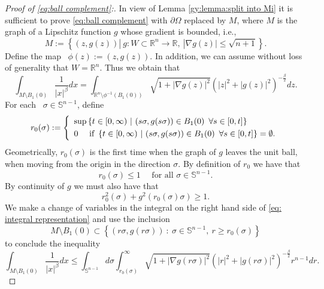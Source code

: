 \documentclass[reqno,12pt]{amsart}
\newcommand{\R}{\mathbb{R}}
\numberwithin{equation}{section}
\theoremstyle{plain}
\theoremstyle{definition}
\renewcommand{\leq}{\leqslant}
\renewcommand{\geq}{\geqslant}
\begin{document}
\begin{proof}
[Proof of \eqref{eq:ball complement}:]   In view of Lemma \ref{gy:lemma:split into Mi} it is sufficient to prove \eqref{eq:ball complement} with $\partial \Omega$ replaced by $M$,  where $M$ is the graph of a Lipschitz function $g$ whose gradient is bounded, i.e., 
$$M := \left\{(z,g(z)) 
 | \ g : W \subset \mathbb{R}^n \rightarrow \mathbb{R}, \ |\nabla g(z)| \leq  \sqrt{n+1} \right\}. 
 $$
Define the map ~$\phi(z):= (z,g(z))$. In addition, we can assume without loss of generality that $W=\R^n.$  Thus we obtain that
\begin{equation}
    \label{eq: integral representation}
    \int_{M\setminus B_1(0)} \frac{1}{|x|^\beta}dx = \int_{\mathbb{R}^n \setminus \phi^{-1}(B_1(0))} \sqrt{1+|\nabla g(z)|^2} \left( |z|^2+ |g(z)|^2\right)^{-\frac{\beta}{2}}dz.
\end{equation}
For each ~$\sigma \in \mathbb{S}^{n-1}$, define
$$
  r_0(\sigma) := \left\{
   \begin{array}{l}
   \sup \left\{ t\in [0,\infty) \ | \  (s\sigma, g(s\sigma))   
  \in B_1(0)\, \ \forall s \in [0,t] \right\}
   \smallskip \\
   0 \quad\text{ if } \left\{ t\in [0,\infty) \ | \  (s\sigma, g(s\sigma))   
  \in B_1(0)\, \ \forall s \in [0,t] \right\}=\emptyset.
  \end{array}
  \right.
$$
Geometrically, $r_0(\sigma)$ is the first time when the graph of $g$ leaves the unit ball, when moving from the origin in the direction $\sigma.$ 
By definition of $r_0$ we have that 
\begin{equation}
 \label{r0 sigma less one}
  r_0(\sigma)\leq 1\quad\text{ for all }\sigma\in \mathbb{S}^{n-1}.
\end{equation}
By continuity of $g$ we must also have that  
\begin{equation}
    \label{eq: rsigma relation}
    r_0^2(\sigma) + g^2(r_0(\sigma)\sigma) \geq 1.
\end{equation}
We make a change of variables in the integral on the right hand side of \eqref{eq: integral representation} and use the inclusion
$$M\setminus B_1(0) \subset  \left\{ (r\sigma, g(r\sigma)) \ :  \ \sigma \in \mathbb{S}^{n-1}, \ r \geq r_0(\sigma)\right\}$$
to conclude the inequality
\begin{equation*}
    \label{eq: integral representation 2}
    \int_{M\setminus B_1(0)} \frac{1}{|x|^\beta}dx \leq \int_{\mathbb{S}^{n-1}}d\sigma   \int_{r_0(\sigma)}^\infty \sqrt{1+|\nabla g(r\sigma)|^2} \left( |r|^2+ |g(r\sigma)|^2\right)^{-\frac{\beta}{2}}r^{n-1}dr.

\end{equation*}
\end{proof}
\end{document}
